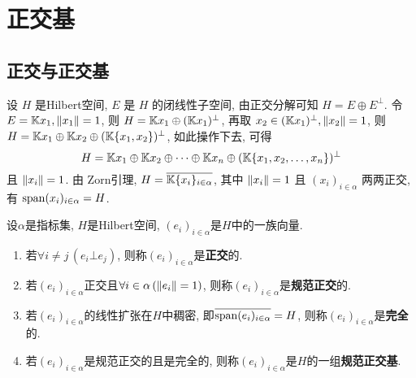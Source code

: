 \section{正交基}
	\subsection{正交与正交基}
	设 $ H $ 是Hilbert空间, $ E $ 是 $ H $ 的闭线性子空间, 由正交分解可知 $ H=E\oplus E^{\bot} $. 令 $ E=\mathbb{K} x_{1}, \left\| x_{1} \right\|=1 $, 则 $ H=\mathbb{K} x_{1}\oplus (\mathbb{K} x_{1})^{\bot} $, 再取 $ x_{2}\in (\mathbb{K} x_{1})^{\bot}, \left\| x_{2} \right\|=1 $, 则 $ H=\mathbb{K} x_{1}\oplus \mathbb{K} x_{2}\oplus (\mathbb{K}\{ x_{1}, x_{2} \})^{\bot} $, 如此操作下去, 可得
	\[
		H=\mathbb{K} x_{1}\oplus \mathbb{K} x_{2}\oplus\cdots\oplus\mathbb{K} x_{n}\oplus(\mathbb{K} \{ x_{1}, x_{2}, \dots, x_{n} \})^{\bot}
	\]
	且 $ \left\| x_{i} \right\|=1 $. 由 Zorn引理, $ H=\overline{\mathbb{K}\{ x_{i} \}_{i\in\alpha}} $, 其中 $ \left\| x_{i} \right\|=1 $ 且 $ (x_{i})_{i\in\alpha} $ 两两正交, 有 $ \operatorname{span}(x_{i})_{i\in\alpha}=H $. 
	
	\begin{Definition}[规范正交基]
	设$ \alpha $是指标集, $ H $是Hilbert空间, $ (e_i)_{i\in\alpha} $是$ H $中的一族向量.
	\begin{enumerate}[(1)]
	\item 若$ \forall i\ne j\,(e_i\bot e_j) $, 则称$ (e_i)_{i\in\alpha} $是\textbf{正交}的.
	\item 若$ (e_i)_{i\in\alpha} $正交且$ \forall i\in\alpha\,(\left\| e_i \right\|=1) $, 则称$ (e_i)_{i\in\alpha} $是\textbf{规范正交}的.
	\item 若$ (e_i)_{i\in\alpha} $的线性扩张在$ H $中稠密, 即$ \overline{\operatorname{span} (e_i)_{i\in\alpha}}=H $, 则称$ (e_i)_{i\in\alpha} $是\textbf{完全}的.
	\item 若$ (e_i)_{i\in\alpha} $是规范正交的且是完全的, 则称$ (e_i)_{i\in\alpha} $是$ H $的一组\textbf{规范正交基}.
	\end{enumerate}
	\end{Definition}
	
